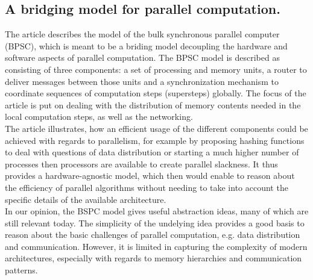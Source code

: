 \subsection{A bridging model for parallel computation.}
The article describes the model of the bulk synchronous parallel computer (BPSC), which is meant to be a briding model decoupling the hardware and software aspects of parallel computation. The BPSC model is described as consisting of three components: a set of processing and memory units, a router to deliver messages between those units and a synchronization mechanism to coordinate sequences of computation steps (supersteps) globally. The focus of the article is put on dealing with the distribution of memory contents needed in the local computation steps, as well as the networking.\\
The article illustrates, how an efficient usage of the different components could be achieved with regards to parallelism, for example by proposing hashing functions to deal with questions of data distribution or starting a much higher number of processes then processors are available to create parallel slackness. It thus provides a hardware-agnostic model, which then would enable to reason about the efficiency of parallel algorithms without needing to take into account the specific details of the available architecture.\\
In our opinion, the BSPC model gives useful abstraction ideas, many of which are still relevant today. The simplicity of the undelying idea provides a good basis to reason about the basic challenges of parallel computation, e.g. data distribution and communication. However, it is limited in capturing the complexity of modern architectures, especially with regards to memory hierarchies and communication patterns.